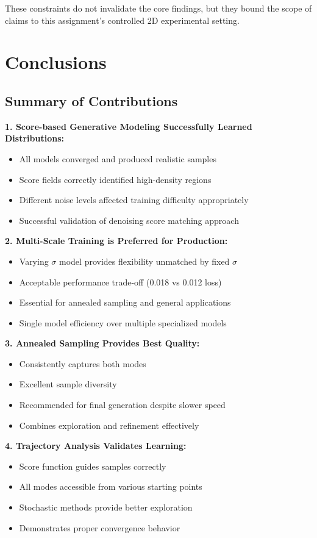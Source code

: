 \documentclass[journal]{IEEEtran}
\begin{document}
These constraints do not invalidate the core findings, but they bound the scope of claims to this assignment's controlled 2D experimental setting.

\section{Conclusions}

\subsection{Summary of Contributions}

\textbf{1. Score-based Generative Modeling Successfully Learned Distributions:}
\begin{itemize}
    \item All models converged and produced realistic samples
    \item Score fields correctly identified high-density regions
    \item Different noise levels affected training difficulty appropriately
    \item Successful validation of denoising score matching approach
\end{itemize}

\textbf{2. Multi-Scale Training is Preferred for Production:}
\begin{itemize}
    \item Varying $\sigma$ model provides flexibility unmatched by fixed $\sigma$
    \item Acceptable performance trade-off (0.018 vs 0.012 loss)
    \item Essential for annealed sampling and general applications
    \item Single model efficiency over multiple specialized models
\end{itemize}

\textbf{3. Annealed Sampling Provides Best Quality:}
\begin{itemize}
    \item Consistently captures both modes
    \item Excellent sample diversity
    \item Recommended for final generation despite slower speed
    \item Combines exploration and refinement effectively
\end{itemize}

\textbf{4. Trajectory Analysis Validates Learning:}
\begin{itemize}
    \item Score function guides samples correctly
    \item All modes accessible from various starting points
    \item Stochastic methods provide better exploration
    \item Demonstrates proper convergence behavior
\end{itemize}
\end{document}
